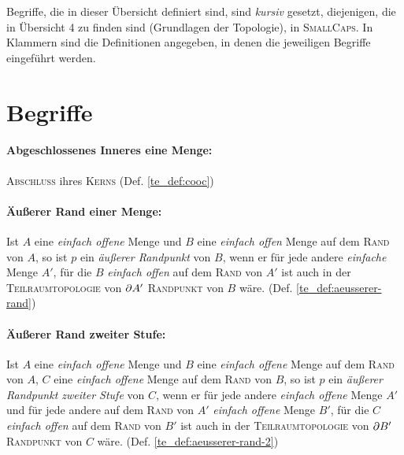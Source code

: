 

\newcommand{\overviewnumber}{5}
\newcommand{\overviewname}{Weitere topologische Begriffe}



\noindent
Begriffe, die in dieser Übersicht definiert sind, sind \textit{kursiv} gesetzt, diejenigen, die in Übersicht 4 zu finden sind (Grundlagen der Topologie), in \textsc{SmallCaps}. In Klammern sind die Definitionen angegeben, in denen die jeweiligen Begriffe eingeführt werden.

\section*{Begriffe}

    \paragraph{Abgeschlossenes Inneres eine Menge:} \textsc{Abschluss} ihres \textsc{Kerns} (Def. \ref{te_def:cooc})
    
    \paragraph{Äußerer Rand einer Menge:} Ist $A$ eine \textit{einfach offene} Menge und $B$ eine \textit{einfach offen} Menge auf dem \textsc{Rand} von $A$, so ist $p$ ein \textit{äußerer Randpunkt} von $B$, wenn er für jede andere \textit{einfache} Menge $A'$, für die $B$ \textit{einfach offen} auf dem \textsc{Rand} von $A'$ ist auch in der \textsc{Teilraumtopologie} von $\partial A'$ \textsc{Randpunkt} von $B$ wäre. (Def. \ref{te_def:aeusserer-rand})
    
    \paragraph{Äußerer Rand zweiter Stufe:} Ist $A$ eine \textit{einfach offene} Menge und $B$ eine \textit{einfach offene} Menge auf dem \textsc{Rand} von $A$, $C$ eine \textit{einfach offene} Menge auf dem \textsc{Rand} von $B$, so ist $p$ ein \textit{äußerer Randpunkt zweiter Stufe} von $C$, wenn er für jede andere \textit{einfach offene} Menge $A'$ und für jede andere auf dem \textsc{Rand} von $A'$ \textit{einfach offene} Menge $B'$, für die $C$ \textit{einfach offen} auf dem \textsc{Rand} von $B'$ ist auch in der \textsc{Teilraumtopologie} von $\partial B'$ \textsc{Randpunkt} von $C$ wäre.  (Def. \ref{te_def:aeusserer-rand-2})

